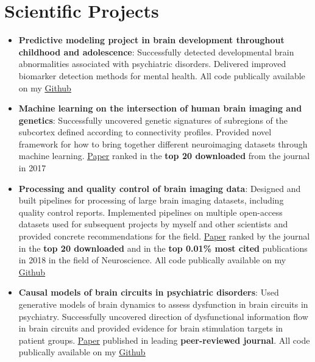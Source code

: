 \documentclass[letterpaper,10pt]{article}
\newcommand{\resumeItem}[2]{
  \item\small{
    \textbf{#1}{: #2 \vspace{-2pt}}
  }
}
\newcommand{\resumeSubItem}[2]{\resumeItem{#1}{#2}\vspace{-4pt}}
\newcommand{\resumeSubHeadingListStart}{\begin{itemize}[leftmargin=*]}
\newcommand{\resumeSubHeadingListEnd}{\end{itemize}}
\begin{document}
\section{Scientific Projects}
  \resumeSubHeadingListStart
    \resumeSubItem{Predictive modeling project in brain development throughout childhood and adolescence}
      {Successfully detected developmental brain abnormalities associated with psychiatric disorders. Delivered improved biomarker detection methods for mental health. All code publically available on my \href{https://github.com/lindenmp/NormativeNeuroDev_CrossSec}{\underline{Github}}}
      \newline
    \resumeSubItem{Machine learning on the intersection of human brain imaging and genetics}
      {Successfully uncovered genetic signatures of subregions of the subcortex defined according to connectivity profiles. Provided novel framework for how to bring together different neuroimaging datasets through machine learning. \href{https://onlinelibrary.wiley.com/doi/full/10.1111/gbb.12386}{\underline{Paper}} ranked in the \textbf{top 20 downloaded} from the journal in 2017}
      \newline
    \resumeSubItem{Processing and quality control of brain imaging data}
      {Designed and built pipelines for processing of large brain imaging datasets, including quality control reports. Implemented pipelines on multiple open-access datasets used for subsequent projects by myself and other scientists and provided concrete recommendations for the field. \href{https://www.sciencedirect.com/science/article/pii/S1053811917310972}{\underline{Paper}} ranked by the journal in the \textbf{top 20 downloaded} and in the \textbf{top 0.01\% most cited} publications in 2018 in the field of Neuroscience. All code publically available on my \href{https://github.com/lindenmp/rs-fMRI}{\underline{Github}}}
      \newline
    \resumeSubItem{Causal models of brain circuits in psychiatric disorders}
      {Used generative models of brain dynamics to assess dysfunction in brain circuits in psychiatry. Successfully uncovered direction of dysfunctional information flow in brain circuits and provided evidence for brain stimulation targets in patient groups. \href{https://www.sciencedirect.com/science/article/pii/S1053811919306585}{\underline{Paper}} published in leading \textbf{peer-reviewed journal}. All code publically available on my \href{https://github.com/lindenmp/rs-fMRI/tree/master/stats/spDCM}{\underline{Github}}}
  \resumeSubHeadingListEnd
\end{document}

